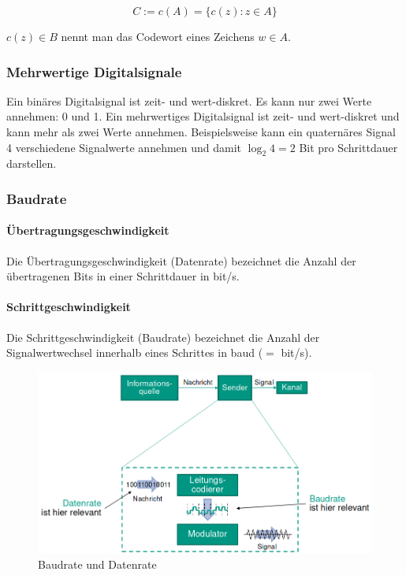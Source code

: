 \documentclass[a4paper, 14pt]{article}
\begin{document}
	\begin{equation*}
		C := c(A) = \{ c(z) : z \in A \}
	\end{equation*}

	$c(z) \in B$ nennt man das Codewort eines Zeichens $w \in A$.

	\subsubsection{Mehrwertige Digitalsignale}

	Ein binäres Digitalsignal ist zeit- und wert-diskret.
	Es kann nur zwei Werte annehmen: 0 und 1.
	Ein mehrwertiges Digitalsignal ist zeit- und wert-diskret und kann mehr als zwei Werte annehmen.
	Beispielsweise kann ein quaternäres Signal 4 verschiedene Signalwerte annehmen und damit $\log_2{}4 = 2$ Bit pro Schrittdauer darstellen.

	\subsubsection{Baudrate}

	\paragraph{Übertragungsgeschwindigkeit}
	
	Die Übertragungsgeschwindigkeit (Datenrate) bezeichnet die Anzahl der übertragenen Bits in einer Schrittdauer in bit/s.

	\paragraph{Schrittgeschwindigkeit}

	Die Schrittgeschwindigkeit (Baudrate) bezeichnet die Anzahl der Signalwertwechsel innerhalb eines Schrittes in baud ($=$ bit/s).

	\begin{figure}
		\includegraphics[width=\textwidth]{images/03-baudrate-datarate.png}
		\caption{Baudrate und Datenrate}
	\end{figure}
\end{document}
